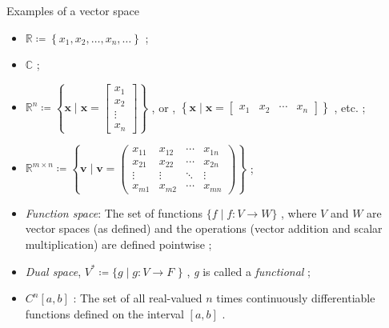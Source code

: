 \documentclass{beamer}
\newcommand\italictext[1]{\textcolor{italics}{\textit{#1}}}
\begin{document}
\begin{frame}{Examples of a vector space}
    \begin{itemize}
        \item $\mathbb{R}\coloneqq\left\{x_1,x_2,\dots,x_n,\dots\right\}$ ;
        \item $\mathbb{C}$ ;
        \item $\mathbb{R}^n\coloneqq\left\{\mathbf{x}\mid\mathbf{x} = \begin{bmatrix} x_1 \\ x_2 \\ \vdots \\ x_n \end{bmatrix}\right\}$ , or ,  $\left\{\mathbf{x}\mid\mathbf{x} =\begin{bmatrix} x_1 & x_2 & \cdots & x_n \end{bmatrix}\right\}$ , etc. ;
        \item $\mathbb{R}^{m\times n}\coloneqq\left\{\mathbf{v}\mid\mathbf{v} = \begin{pmatrix}
            x_{11} & x_{12} & \cdots & x_{1n} \\
            x_{21} & x_{22} & \cdots & x_{2n} \\
            \vdots & \vdots & \ddots & \vdots \\
            x_{m1} & x_{m2} & \cdots & x_{mn}
        \end{pmatrix}\right\}$ ;
        \item \italictext{Function space}: The set of functions $\{f\mid f:V\xrightarrow{}W\}$ , where ${V}$ and ${W}$ are vector spaces (as defined) and the operations (vector addition and scalar multiplication) are defined pointwise ;
        \item \italictext{Dual space}, $V^*\coloneqq\{g\mid g:V\xrightarrow{}\textit{F }\}$ , \textit{g} is called a \italictext{functional} ;
        \item $C^n[a,b]$ : The set of all real-valued $n$ times continuously differentiable functions defined on the interval $[a,b]$ .
    \end{itemize}
\end{frame}
\end{document}
